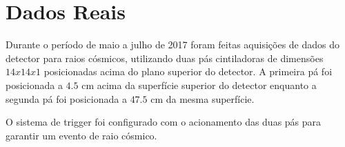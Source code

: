 \chapter{Dados Reais} \label{cap:motivacao}
\vspace{-2cm}

Durante o período de maio a julho de 2017 foram feitas aquisições de dados do detector para raios cósmicos, utilizando duas pás cintiladoras de dimensões $14x14x1$ posicionadas acima do plano superior do detector. A primeira pá foi posicionada a $4.5$ cm acima da superfície superior do detector enquanto a segunda pá foi posicionada a $47.5$ cm da mesma superfície.

O sistema de trigger foi configurado com o acionamento das duas pás para garantir um evento de raio cósmico.
